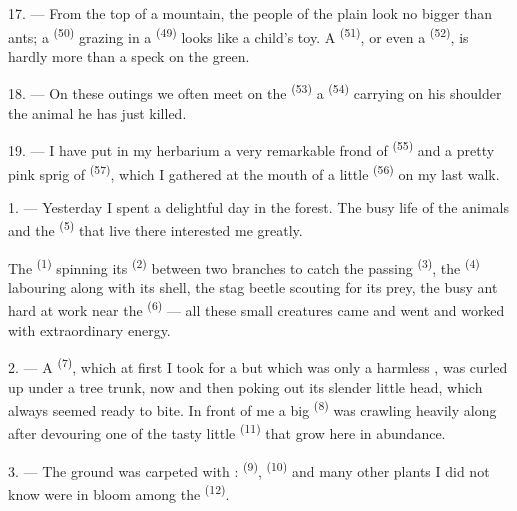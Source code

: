 17. --- From the top of a mountain, the people of the plain look no bigger
than ants; a  \textsuperscript{(50)} grazing in a
 \textsuperscript{(49)} looks like a child's toy. A 
\textsuperscript{(51)}, or even a  \textsuperscript{(52)}, is hardly
more than a speck on the green.

18. --- On these outings we often meet on the  \textsuperscript{(53)} a
 \textsuperscript{(54)} carrying on his shoulder the animal he
has just killed.

19. --- I have put in my herbarium a very remarkable frond of 
\textsuperscript{(55)} and a pretty pink sprig of  \textsuperscript{(57)},
which I gathered at the mouth of a little  \textsuperscript{(56)} on my
last walk.

\VUsaut{3.0mm}
\VUsaut{3.0mm}

\VUsaut{3.0mm}

1. --- Yesterday I spent a delightful day in the forest. The busy life of
the animals and the  \textsuperscript{(5)} that live there interested
me greatly.

The  \textsuperscript{(1)} spinning its  \textsuperscript{(2)}
between two branches to catch the passing  \textsuperscript{(3)}, the
 \textsuperscript{(4)} labouring along with its shell, the stag beetle
scouting for its prey, the busy ant hard at work near the 
\textsuperscript{(6)} --- all these small creatures came and went and worked with
extraordinary energy.

2. --- A  \textsuperscript{(7)}, which at first I took for a
 but which was only a harmless , was
curled up under a tree trunk, now and then poking out its slender little
head, which always seemed ready to bite. In front of me a big 
\textsuperscript{(8)} was crawling heavily along after devouring one of the tasty
little  \textsuperscript{(11)} that grow here in
abundance.

3. --- The ground was carpeted with :
 \textsuperscript{(9)},  \textsuperscript{(10)} and
many other plants I did not know were in bloom among the
 \textsuperscript{(12)}.

